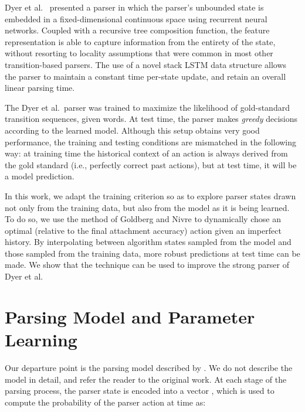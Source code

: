 \documentclass[11pt]{article}
\newcommand{\ignore}[1]{}
\begin{document}
Dyer et al.~ presented a parser in which the
parser's unbounded state is embedded in a fixed-dimensional continuous space using recurrent neural networks. Coupled with a recursive
tree composition function, the feature representation is able to capture
information from the entirety of the state, without resorting to locality
assumptions that were common in most other transition-based parsers.
The use of a novel stack LSTM
data structure allows the parser to maintain a constant time per-state update,
and retain an overall linear parsing time. 

The Dyer et al.~parser was trained to maximize the likelihood of
gold-standard transition sequences, given words. At test time, the
parser makes \emph{greedy} decisions according to the learned
model. Although this setup obtains very good performance, the training
and testing conditions are mismatched in the following way: at
training time the historical context of an action is always derived
from the gold standard (i.e., perfectly correct past actions), but at test time, it will be a model prediction.

In this work, we adapt the training criterion so as to explore parser states drawn not only from the training data, but also from the model as it is being learned.
To do so, we use the method of Goldberg and Nivre  to dynamically chose an optimal (relative to the final attachment accuracy) action given an imperfect history. By interpolating between algorithm states sampled from the model and those sampled from the training data, more robust predictions at test time can be made. We show that
the technique can be used to improve the strong parser of Dyer
et al.

\ignore{
\paragraph{Notation} We follow the convention that vectors are written with lowercase, boldface letters (e.g.,  or ); matrices are written with uppercase, boldface letters (e.g., , , or ), and scalars are written as lowercase letters (e.g.,  or ). Structured objects such as sequences of discrete symbols are written with lowercase, bold, italic letters (e.g.,  refers to a sequence of input words). 
We use a semicolon to denote vector concatenation (e.g., ).
}

\section{Parsing Model and Parameter Learning}
Our departure point is the parsing model described by
.
We do not describe the model in detail, and refer the reader to the original
work.
At each stage  of the parsing process, the parser state is encoded into a vector
, which is used to compute the probability of the parser action at
time  as:
\end{document}
